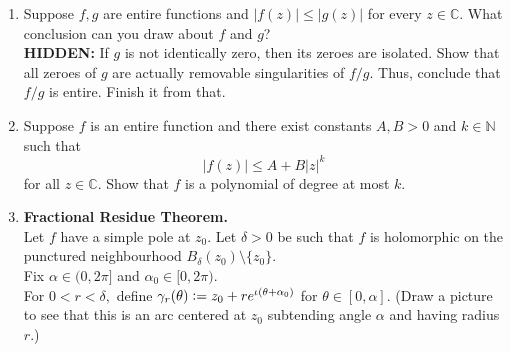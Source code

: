 \documentclass[12pt]{article}
\theoremstyle{definition}
\numberwithin{thm}{section}
\newcommand{\hint}[1]{\textbf{HIDDEN:} {\color[rgb]{0.95, 0.95, 0.95}#1}}
\newcommand{\md}[1]{{\left\lvert #1 \right\lvert}}
\begin{document}
\begin{enumerate}
	Prove this via the following steps:
	\begin{enumerate}
		\item Let $g$ be the inverse of $f$. In particular, $g(f(z)) = z$ for all $z \in \mathbb{D}$.
		\item Use chain rule to conclude that 
		\begin{equation} \label{eq:04}
			g'(0) f'(\alpha) = 1.
		\end{equation}
		\item Note that $f(\alpha) = 0$ and $g(0) = \alpha$. Now, use the conclusion of the previous extremal problem to conclude that
		\begin{equation*} 
			\md{f'(\alpha)} \le \frac{1}{1 - \md{\alpha}^2}, \quad \md{g'(0)} \le 1 - \md{\alpha}^2.
		\end{equation*}
		Use  to conclude that equalities hold above. \\
		In turn, use the final conclusion of the extremal problem solution to conclude the theorem.
	\end{enumerate}
	\item Suppose $f, g$ are entire functions and $|f(z)| \le |g(z)|$ for every $z \in \mathbb{C}.$ What conclusion can you draw about $f$ and $g$? \\
	\hint{If $g$ is not identically zero, then its zeroes are isolated. Show that all zeroes of $g$ are actually removable singularities of $f/g.$ Thus, conclude that $f/g$ is entire. Finish it from that. }
	\item Suppose $f$ is an entire function and there exist constants $A, B > 0$ and $k \in \mathbb{N}$ such that 
	\begin{equation*} 
		|f(z)| \le A + B|z|^k
	\end{equation*}
	for all $z \in \mathbb{C}.$ Show that $f$ is a polynomial of degree at most $k.$
	\item \textbf{Fractional Residue Theorem.} \\
	Let $f$ have a simple pole at $z_0.$ Let $\delta > 0$ be such that $f$ is holomorphic on the punctured neighbourhood $B_\delta(z_0)\setminus\{z_0\}.$\\
	Fix $\alpha \in (0, 2\pi]$ and $\alpha_0 \in [0, 2\pi).$ \\
	For $0 < r < \delta,$ define $\gamma_r(\theta) \vcentcolon= z_0 + re^{\iota(\theta + \alpha_0)}$ for $\theta \in [0, \alpha].$ (Draw a picture to see that this is an arc centered at $z_0$ subtending angle $\alpha$ and having radius $r.$)


\end{enumerate}
\end{document}
